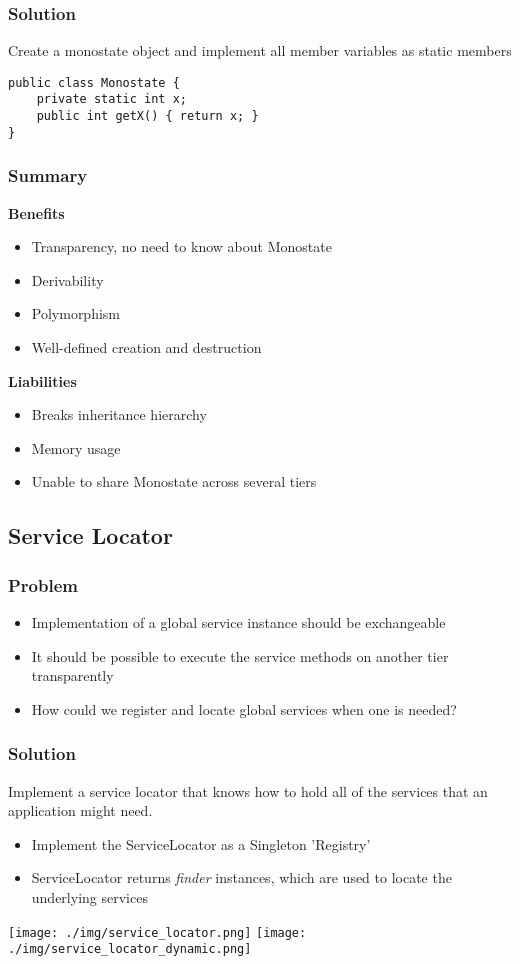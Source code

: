 \subsubsection{Solution}
Create a monostate object and implement all member variables as static members 
\begin{lstlisting}
public class Monostate {
    private static int x;
    public int getX() { return x; }
}
\end{lstlisting}
\subsubsection{Summary}
\textbf{Benefits}
\begin{itemize}
    \item Transparency, no need to know about Monostate
    \item Derivability
    \item Polymorphism
    \item Well-defined creation and destruction
\end{itemize}
\textbf{Liabilities}
\begin{itemize}
    \item Breaks inheritance hierarchy
    \item Memory usage
    \item Unable to share Monostate across several tiers
\end{itemize}

\subsection{Service Locator}
\subsubsection{Problem}
\begin{itemize}
    \item Implementation of a global service instance should be exchangeable
    \item It should be possible to execute the service methods on another tier transparently
    \item How could we register and locate global services when one is needed?
\end{itemize}
\subsubsection{Solution}
Implement a service locator that knows how to hold all of the services that an application might need.
\begin{itemize}
    \item Implement the ServiceLocator as a Singleton 'Registry'
    \item ServiceLocator returns \textit{finder} instances, which are used to locate the underlying services
\end{itemize} 
\texttt{[image: ./img/service\_locator.png]}
\texttt{[image: ./img/service\_locator\_dynamic.png]}

